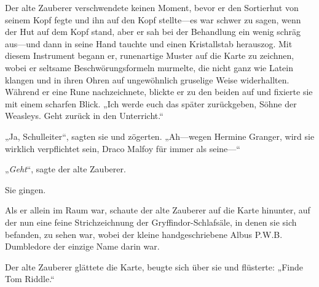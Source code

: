 Der alte Zauberer verschwendete keinen Moment, bevor er den Sortierhut von seinem Kopf fegte und ihn auf den Kopf stellte—es war schwer zu sagen, wenn der Hut auf dem Kopf stand, aber er sah bei der Behandlung ein wenig schräg aus—und dann in seine Hand tauchte und einen Kristallstab herauszog. Mit diesem Instrument begann er, runenartige Muster auf die Karte zu zeichnen, wobei er seltsame Beschwörungsformeln murmelte, die nicht ganz wie Latein klangen und in ihren Ohren auf ungewöhnlich gruselige Weise widerhallten. Während er eine Rune nachzeichnete, blickte er zu den beiden auf und fixierte sie mit einem scharfen Blick.
„Ich werde euch das später zurückgeben, Söhne der Weasleys. Geht zurück in den Unterricht.“

„Ja, Schulleiter“, sagten sie und zögerten. „Ah—wegen Hermine Granger, wird sie wirklich verpflichtet sein, Draco Malfoy für immer als seine—“

„\emph{Geht}“, sagte der alte Zauberer.

Sie gingen.

Als er allein im Raum war, schaute der alte Zauberer auf die Karte hinunter, auf der nun eine feine Strichzeichnung der Gryffindor-Schlafsäle, in denen sie sich befanden, zu sehen war, wobei der kleine handgeschriebene Albus P.W.B. Dumbledore der einzige Name darin war.

Der alte Zauberer glättete die Karte, beugte sich über sie und flüsterte: „Finde Tom Riddle.“

